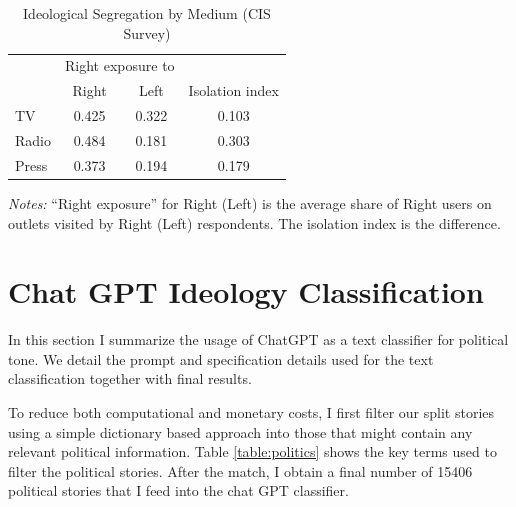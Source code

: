 \documentclass[12pt]{article}
\begin{document}



	
	
	
	\begin{table}[htbp]
		\caption{Ideological Segregation by Medium (CIS Survey)}
		\label{tab:isolation_table}
		
		\centering
		\begin{tabular}{lccc}
			\hline
			& \multicolumn{2}{c}{Right exposure to } & \\
			\cline{2-3}
			& Right & Left & Isolation index \\
			\hline
			TV    & 0.425 & 0.322 & 0.103 \\
			Radio & 0.484 & 0.181 & 0.303 \\
			Press & 0.373 & 0.194 & 0.179 \\
			\hline
		\end{tabular}
		
		\begin{tablenotes}
			\small
			\item \textit{Notes:} “Right exposure” for Right (Left) is the average share of Right users on outlets visited by Right (Left) respondents. The isolation index is the difference.
		\end{tablenotes}
	\end{table}
	
	

\section{Chat GPT Ideology Classification}\label{sec:chat_gpt}
	
	In this section I summarize the usage of ChatGPT as a text classifier for political tone. We detail the prompt and specification details used for the text classification together with final results. 
	
	
	
	
	To reduce both computational and monetary costs, I first filter our split stories using a simple dictionary based approach into those that might contain any relevant political information. Table \ref{table:politics} shows the key terms used to filter the political stories. After the match, I obtain a final number of 15406 political stories that I feed into the chat GPT classifier.
	
	\clearpage
	
\end{document}
